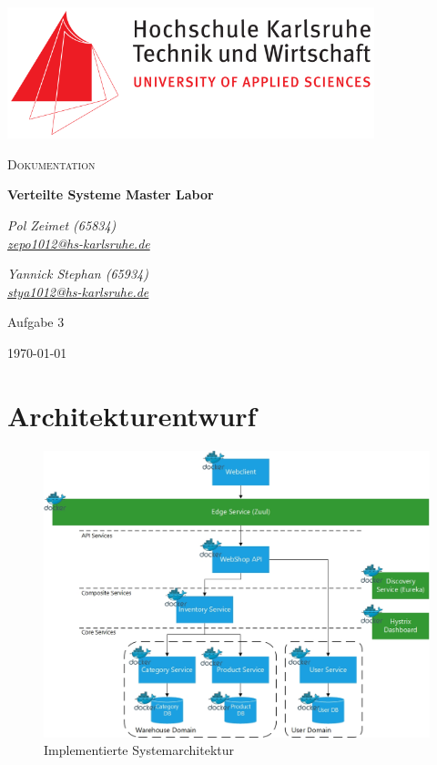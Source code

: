 \documentclass[12pt,a4paper]{article}
\begin{document}
	\begin{titlepage}
		\centering
		\includegraphics[width=0.8\textwidth]{img/Hska_logo.png}\par\vspace{1cm}
		{\scshape\LARGE Dokumentation\par}
		\vspace{1.5cm}
		{\huge\bfseries Verteilte Systeme Master Labor\par}
		\vspace{2cm}
		{\Large\itshape Pol Zeimet (65834) \\\href{mailto:zepo1012@hs-karlsruhe.de}{zepo1012@hs-karlsruhe.de}\par}
		\vfill
		{\Large\itshape Yannick Stephan (65934) \\\href{mailto:stya1012@hs-karlsruhe.de}{stya1012@hs-karlsruhe.de}\par}
		\vfill
		\large Aufgabe 3
		
		\vfill
		
		{\large \today\par}
	\end{titlepage}
	\section{Architekturentwurf}
	\label{sec:Architekturentwurf}	
		\begin{figure}[h]
			\centering
			\includegraphics[scale=0.65]{diagrams/architecture_v2.jpg}
			\caption{Implementierte Systemarchitektur}
			\label{fig:microservices-architecture}
		\end{figure}
\end{document}
